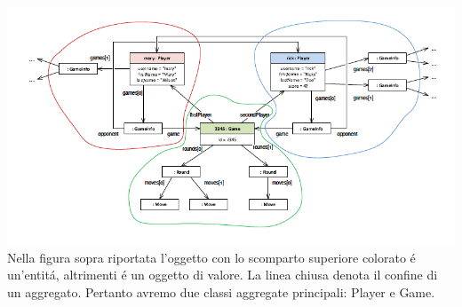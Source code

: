 \includegraphics[width=1\textwidth]{img/designAggregati}
Nella figura sopra riportata l'oggetto con lo scomparto superiore colorato é un'entitá, altrimenti
é un oggetto di valore. La linea chiusa denota il confine di un aggregato.
Pertanto avremo due classi aggregate principali: Player e Game.


